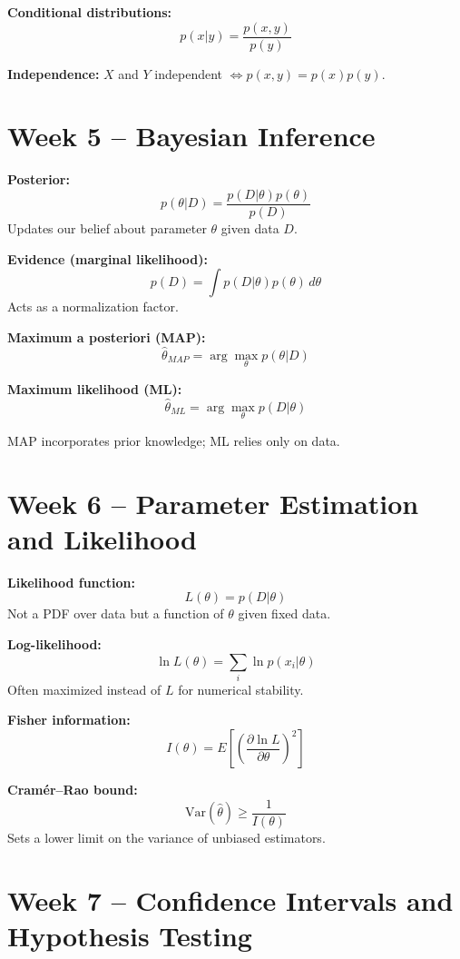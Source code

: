 \documentclass[11pt]{article}
\begin{document}
\textbf{Conditional distributions:}
\[
    p(x|y) = \frac{p(x,y)}{p(y)}
\]

\textbf{Independence:}
$X$ and $Y$ independent $\iff p(x,y) = p(x)p(y)$.

\section*{Week 5 – Bayesian Inference}

\textbf{Posterior:}
\[
    p(\theta|D) = \frac{p(D|\theta)p(\theta)}{p(D)}
\]
Updates our belief about parameter $\theta$ given data $D$.

\textbf{Evidence (marginal likelihood):}
\[
    p(D) = \int p(D|\theta)p(\theta)\, d\theta
\]
Acts as a normalization factor.

\textbf{Maximum a posteriori (MAP):}
\[
    \hat{\theta}_{MAP} = \arg\max_\theta p(\theta|D)
\]

\textbf{Maximum likelihood (ML):}
\[
    \hat{\theta}_{ML} = \arg\max_\theta p(D|\theta)
\]

MAP incorporates prior knowledge; ML relies only on data.

\section*{Week 6 – Parameter Estimation and Likelihood}

\textbf{Likelihood function:}
\[
    L(\theta) = p(D|\theta)
\]
Not a PDF over data but a function of $\theta$ given fixed data.

\textbf{Log-likelihood:}
\[
    \ln L(\theta) = \sum_i \ln p(x_i | \theta)
\]
Often maximized instead of $L$ for numerical stability.

\textbf{Fisher information:}
\[
    I(\theta) = E\left[ \left( \frac{\partial \ln L}{\partial \theta} \right)^2 \right]
\]

\textbf{Cramér–Rao bound:}
\[
    \mathrm{Var}(\hat{\theta}) \ge \frac{1}{I(\theta)}
\]
Sets a lower limit on the variance of unbiased estimators.

\section*{Week 7 – Confidence Intervals and Hypothesis Testing}
\end{document}
